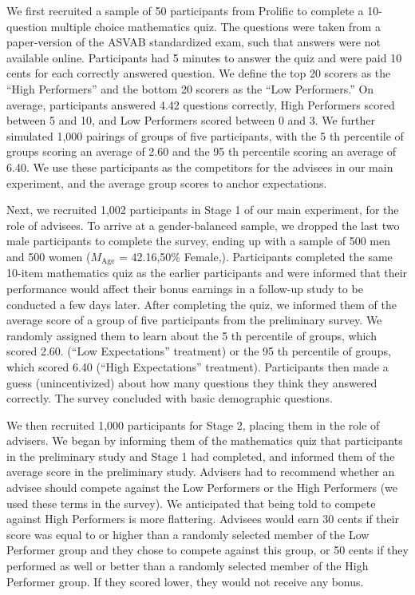 \documentclass[
  man,floatsintext]{apa6}
\begin{document}
We first recruited a sample of 50 participants from Prolific to complete a 10-question multiple choice mathematics quiz. The questions were taken from a paper-version of the ASVAB standardized exam, such that answers were not available online. Participants had 5 minutes to answer the quiz and were paid 10 cents for each correctly answered question. We define the top 20 scorers as the ``High Performers'' and the bottom 20 scorers as the ``Low Performers.'' On average, participants answered 4.42 questions correctly, High Performers scored between 5 and 10, and Low Performers scored between 0 and 3. We further simulated 1,000 pairings of groups of five participants, with the 5 th percentile of groups scoring an average of 2.60 and the 95 th percentile scoring an average of 6.40. We use these participants as the competitors for the advisees in our main experiment, and the average group scores to anchor expectations.

Next, we recruited 1,002 participants in Stage 1 of our main experiment, for the role of advisees. To arrive at a gender-balanced sample, we dropped the last two male participants to complete the survey, ending up with a sample of 500 men and 500 women (\(M_{\text{Age}}\) = 42.16,50\% Female,). Participants completed the same 10-item mathematics quiz as the earlier participants and were informed that their performance would affect their bonus earnings in a follow-up study to be conducted a few days later. After completing the quiz, we informed them of the average score of a group of five participants from the preliminary survey. We randomly assigned them to learn about the 5 th percentile of groups, which scored 2.60. (``Low Expectations'' treatment) or the 95 th percentile of groups, which scored 6.40 (``High Expectations'' treatment). Participants then made a guess (unincentivized) about how many questions they think they answered correctly. The survey concluded with basic demographic questions.

We then recruited 1,000 participants for Stage 2, placing them in the role of advisers. We began by informing them of the mathematics quiz that participants in the preliminary study and Stage 1 had completed, and informed them of the average score in the preliminary study. Advisers had to recommend whether an advisee should compete against the Low Performers or the High Performers (we used these terms in the survey). We anticipated that being told to compete against High Performers is more flattering. Advisees would earn 30 cents if their score was equal to or higher than a randomly selected member of the Low Performer group and they chose to compete against this group, or 50 cents if they performed as well or better than a randomly selected member of the High Performer group. If they scored lower, they would not receive any bonus.
\end{document}
